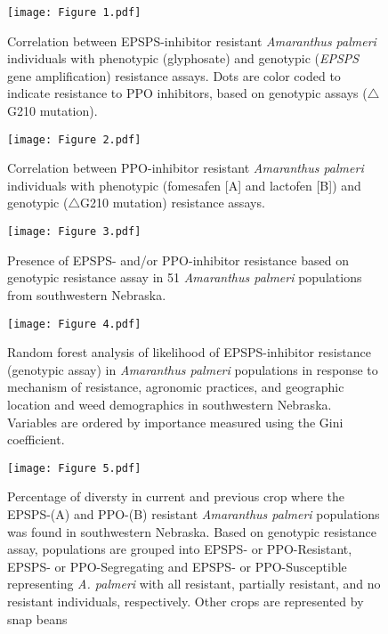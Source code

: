 \documentclass{article}
\begin{document}
\listoffigures

\begin{figure}[htp]
    \centering
    \texttt{[image: Figure 1.pdf]}
    \caption{Correlation between EPSPS-inhibitor resistant \textit{Amaranthus palmeri} individuals with phenotypic (glyphosate) and genotypic (\textit{EPSPS} gene amplification) resistance assays. Dots are color coded to indicate resistance to PPO inhibitors, based on genotypic assays ($\triangle$G210 mutation).}
    \label{fig:galaxy}
\end{figure}



\begin{landscape}
\begin{figure}[htp]
    \centering
    \texttt{[image: Figure 2.pdf]}
    \caption{Correlation between PPO-inhibitor resistant \textit{Amaranthus palmeri} individuals with phenotypic (fomesafen [A] and lactofen [B]) and genotypic ($\triangle$G210 mutation) resistance assays.}
    \label{fig:galaxy}
\end{figure}
\end{landscape}
 
 
 
\begin{landscape}
\begin{figure}[htp]
    \centering
    \texttt{[image: Figure 3.pdf]}
    \caption{Presence of EPSPS- and/or PPO-inhibitor resistance based on genotypic resistance assay in 51 \textit{Amaranthus palmeri} populations from southwestern Nebraska.}
    \label{fig:galaxy}
\end{figure}
\end{landscape}
 
 

\begin{figure}[htp]
    \centering
    \texttt{[image: Figure 4.pdf]}
    \caption{Random forest analysis of likelihood of EPSPS-inhibitor resistance (genotypic assay) in \textit{Amaranthus palmeri} populations in response to mechanism of resistance, agronomic practices, and geographic location and weed demographics in southwestern Nebraska. Variables are ordered by importance measured using the Gini coefficient.}
    \label{fig:galaxy}
\end{figure}



\begin{landscape}
\begin{figure}[htp]
    \centering
    \texttt{[image: Figure 5.pdf]}
    \caption{Percentage of diversty in current and previous crop where the EPSPS-(A) and PPO-(B) resistant \textit{Amaranthus palmeri} populations was found in southwestern Nebraska. Based on genotypic resistance assay, populations are grouped into EPSPS- or PPO-Resistant, EPSPS- or PPO-Segregating and EPSPS- or PPO-Susceptible representing \textit{A. palmeri} with all resistant, partially resistant, and no resistant individuals, respectively. Other crops are represented by snap beans}
    \label{fig:galaxy}
\end{figure}
\end{landscape}


 
\end{document}
